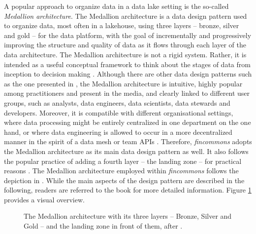 \documentclass[a4paper, 11pt]{report}
\begin{document}
A popular approach to organize data in a data lake setting is the so-called \emph{Medallion architecture}. The Medallion architecture is a data design pattern used to organize data, most often in a lakehouse, using three layers -- bronze, silver and gold -- for the data platform, with the goal of incrementally and progressively improving the structure and quality of data as it flows through each layer of the data architecture. The Medallion architecture is not a rigid system. Rather, it is intended as a useful conceptual framework to think about the stages of data from inception to decision making \parencite{Strengholt.2025}. Although there are other data design patterns such as the one presented in \textcite{Gorelik.2019}, the Medallion architecture is intuitive, highly popular among practitioners and present in the media, and clearly linked to different user groups, such as analysts, data engineers, data scientists, data stewards and developers. Moreover, it is compatible with different organisational settings, where data processing might be entirely centralized in one department on the one hand, or where data engineering is allowed to occur in a more decentralized manner in the spirit of a data mesh or team APIs \parencite{Evans.2003,Skelton.2025}. Therefore, \emph{fincommons} adopts the Medallion architecture as its main data design pattern as well. It also follows the popular practice of adding a fourth layer -- the landing zone -- for practical reasons \parencite{Strengholt.2025}. The Medallion architecture employed within \emph{fincommons} follows the depiction in \textcite{Strengholt.2025}. While the main aspects of the design pattern are described in the following, readers are referred to the book for more detailed information. Figure \ref{fig:medallion-architecture} provides a visual overview.

\begin{figure}[h]
	\centering
	\caption{The Medallion architecture with its three layers -- Bronze, Silver and Gold -- and the landing zone in front of them, after \textcite{Strengholt.2025}.}
	\label{fig:medallion-architecture}
\end{figure}
\end{document}
